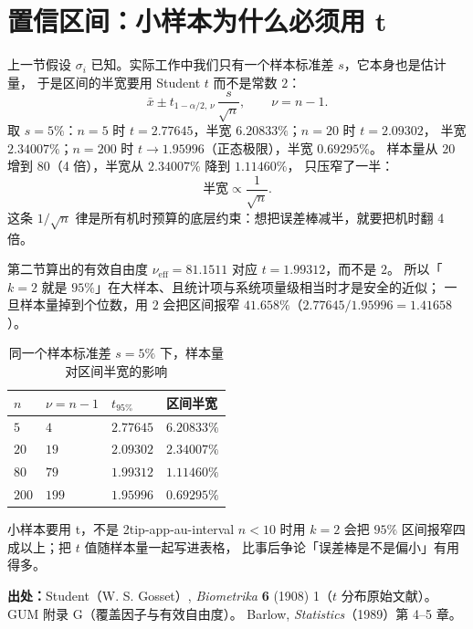 \section{置信区间：小样本为什么必须用 t}
\label{sec:app-au-interval}

上一节假设 $\sigma_i$ 已知。实际工作中我们只有一个样本标准差 $s$，它本身也是估计量，
于是区间的半宽要用 Student $t$ 而不是常数 $2$：
\begin{equation}
\bar x\pm t_{1-\alpha/2,\,\nu}\,\frac{s}{\sqrt{n}},\qquad \nu=n-1 .
\label{eq:app-au-t}
\end{equation}
取 $s=5\%$：$n=5$ 时 $t=2.77645$，半宽 $6.20833\%$；$n=20$ 时 $t=2.09302$，
半宽 $2.34007\%$；$n=200$ 时 $t\to1.95996$（正态极限），半宽 $0.69295\%$。
样本量从 $20$ 增到 $80$（4 倍），半宽从 $2.34007\%$ 降到 $1.11460\%$，
只压窄了一半：
\begin{equation}
\text{半宽}\propto\frac{1}{\sqrt{n}} .
\label{eq:app-au-n}
\end{equation}
这条 $1/\sqrt{n}$ 律是所有机时预算的底层约束：想把误差棒减半，就要把机时翻 4 倍。

第二节算出的有效自由度 $\nu_\mathrm{eff}=81.1511$ 对应 $t=1.99312$，而不是 $2$。
所以「$k=2$ 就是 $95\%$」在大样本、且统计项与系统项量级相当时才是安全的近似；
一旦样本量掉到个位数，用 $2$ 会把区间报窄 $41.658\%$（$2.77645/1.95996=1.41658$）。

\begin{table}[htbp]
\centering
\small
\caption{同一个样本标准差 $s=5\%$ 下，样本量对区间半宽的影响}
\label{tab:app-au-interval}
\begin{tabular}{p{2.6cm}p{3.0cm}p{3.4cm}p{5.2cm}}
\hline
$n$ & $\nu=n-1$ & $t_{95\%}$ & 区间半宽 \\
\hline
$5$ & $4$ & $2.77645$ & $6.20833\%$ \\
$20$ & $19$ & $2.09302$ & $2.34007\%$ \\
$80$ & $79$ & $1.99312$ & $1.11460\%$ \\
$200$ & $199$ & $1.95996$ & $0.69295\%$ \\
\hline
\end{tabular}
\end{table}

\begin{tip}{小样本要用 t，不是 2}{tip-app-au-interval}
$n<10$ 时用 $k=2$ 会把 $95\%$ 区间报窄四成以上；把 $t$ 值随样本量一起写进表格，
比事后争论「误差棒是不是偏小」有用得多。
\end{tip}

{\small

\textbf{出处：}Student（W. S. Gosset）, \emph{Biometrika} \textbf{6} (1908) 1（$t$ 分布原始文献）。
GUM 附录 G（覆盖因子与有效自由度）。
Barlow, \emph{Statistics}（1989）第 4--5 章。
}

